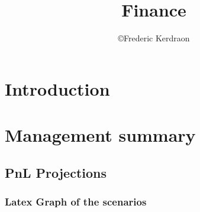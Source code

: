 \documentclass[8pt]{article} %
\title{Finance}
\author{\copyright Frederic Kerdraon}
\begin{document}
\maketitle
\tableofcontents

\section{Introduction}


{\footnotesize
}

\newcommand{\slice}[4]{
  \pgfmathparse{0.5*#1+0.5*#2}
  \let\midangle\pgfmathresult

   slice
  \draw[thick,fill=black!10] (0,0) -- (#1:1) arc (#1:#2:1) -- cycle;

   outer label
  \node[label=\midangle:#4] at (\midangle:1) {};

   inner label
  \pgfmathparse{min((#2-#1-10)/110*(-0.3),0)}
  \let\temp\pgfmathresult
  \pgfmathparse{max(\temp,-0.5) + 0.9}
  \let\innerpos\pgfmathresult
  \node at (\midangle:\innerpos) {#3};
}

\section{Management summary}


\subsection{PnL Projections}


\subsubsection{Latex Graph of the scenarios}
\end{document}
